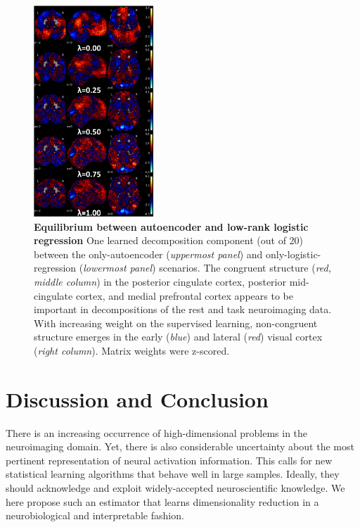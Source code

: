 \documentclass{article} %
\begin{document}
\begin{figure}
  \begin{center}
    \includegraphics[width=0.40\textwidth]{figures/figure3.png}
  \end{center}
  \caption {\textbf{
  Equilibrium between autoencoder and low-rank logistic regression}
  One learned decomposition component (out of 20) between the only-autoencoder
  (\textit{uppermost panel}) and only-logistic-regression
  (\textit{lowermost panel}) scenarios.
  The congruent structure (\textit{red, middle column})
  in the
  posterior cingulate cortex, posterior mid-cingulate cortex, and medial
  prefrontal cortex appears to be important in decompositions of the rest and
  task neuroimaging data. With increasing weight on the supervised learning,
  non-congruent structure emerges in the early (\textit{blue}) and
  lateral (\textit{red}) visual cortex
  (\textit{right column}). Matrix weights were z-scored.
 }
\end{figure}


\section{Discussion and Conclusion}
%
There is an increasing occurrence of high-dimensional problems in the
neuroimaging domain. 
%
%
Yet, there is also considerable uncertainty about the
most pertinent representation
of neural activation information.
This calls for new statistical learning algorithms that
behave well in large samples. Ideally, they should acknowledge
and exploit widely-accepted neuroscientific knowledge.
We here propose such an estimator that learns
dimensionality reduction
in a neurobiological and interpretable fashion.
\end{document}
